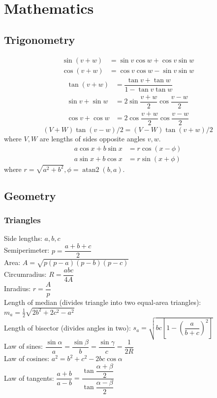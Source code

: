 
\chapter{Mathematics}

\section{Trigonometry}
\begin{align*}
\sin(v+w)&{}=\sin v\cos w+\cos v\sin w\\
\cos(v+w)&{}=\cos v\cos w-\sin v\sin w
\end{align*}
\begin{align*}
\tan(v+w)&{}=\dfrac{\tan v+\tan w}{1-\tan v\tan w}\\
\sin v+\sin w&{}=2\sin\dfrac{v+w}{2}\cos\dfrac{v-w}{2}\\
\cos v+\cos w&{}=2\cos\dfrac{v+w}{2}\cos\dfrac{v-w}{2}
\end{align*}
\[ (V+W)\tan(v-w)/2{}=(V-W)\tan(v+w)/2 \]
where $V, W$ are lengths of sides opposite angles $v, w$.
\begin{align*}
	a\cos x+b\sin x&=r\cos(x-\phi)\\
	a\sin x+b\cos x&=r\sin(x+\phi)
\end{align*}
where $r=\sqrt{a^2+b^2}, \phi=\operatorname{atan2}(b,a)$.

\section{Geometry}

\subsection{Triangles}
Side lengths: $a,b,c$\\
Semiperimeter: $p=\dfrac{a+b+c}{2}$\\
Area: $A=\sqrt{p(p-a)(p-b)(p-c)}$\\
Circumradius: $R=\dfrac{abc}{4A}$\\
Inradius: $r=\dfrac{A}{p}$\\
Length of median (divides triangle into two equal-area triangles): $m_a=\tfrac{1}{2}\sqrt{2b^2+2c^2-a^2}$\\
Length of bisector (divides angles in two): $s_a=\sqrt{bc\left[1-\left(\dfrac{a}{b+c}\right)^2\right]}$\\
Law of sines: $\dfrac{\sin\alpha}{a}=\dfrac{\sin\beta}{b}=\dfrac{\sin\gamma}{c}=\dfrac{1}{2R}$\\
Law of cosines: $a^2=b^2+c^2-2bc\cos\alpha$\\
Law of tangents: $\dfrac{a+b}{a-b}=\dfrac{\tan\dfrac{\alpha+\beta}{2}}{\tan\dfrac{\alpha-\beta}{2}}$\\

